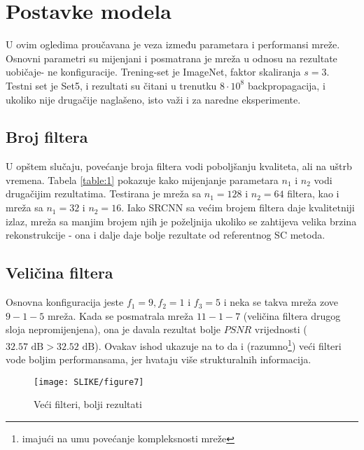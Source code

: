 \documentclass[12pt]{report}
\numberwithin{equation}{section}
\begin{document}
     
  
 
  \section{Postavke modela}
   
   U ovim ogledima proučavana je veza između parametara i performansi mreže. Osnovni parametri su mijenjani i posmatrana je mreža u odnosu na rezultate uobičaje-
ne konfiguracije. Trening-set je ImageNet, faktor skaliranja $s=3$. Testni set je Set5, i rezultati su čitani u trenutku $8 \cdot 10^8$ backpropagacija, i ukoliko nije drugačije naglašeno, isto važi i za naredne eksperimente.


  \subsection{Broj filtera}
  
   U opštem slučaju, povećanje broja filtera vodi poboljšanju kvaliteta, ali na uštrb vremena. Tabela \ref{table:1}
pokazuje kako mijenjanje parametara $n_1$ i $n_2$ vodi drugačijim rezultatima. Testirana je mreža sa $n_1=128$ i $n_2=64$ filtera, kao i mreža sa $n_1=32$ i $n_2=16$. Iako SRCNN sa većim brojem filtera daje kvalitetniji izlaz, mreža sa manjim brojem njih je poželjnija ukoliko se zahtijeva velika brzina rekonstrukcije - ona i dalje daje bolje rezultate od referentnog SC metoda.  
   
  \subsection{Veličina filtera}
   
  Osnovna konfiguracija jeste $f_1=9, f_2=1$ i $f_3=5$ i neka se takva  mreža zove $9-1-5$ mreža. Kada se posmatrala mreža $11-1-7$ (veličina filtera drugog sloja nepromijenjena), ona je davala rezultat bolje $PSNR$ vrijednosti ($32.57 \text{ dB} > 32.52 \text{ dB}$). Ovakav ishod ukazuje na to da i (razumno\footnote{imajući na umu povećanje kompleksnosti mreže}) veći filteri vode boljim performansama, jer hvataju više strukturalnih informacija. 

\begin{wrapfigure}{r}{0.55\textwidth}
\vspace{-20pt}  
  \begin{center}
    \texttt{[image: SLIKE/figure7]}
  \end{center}
  \vspace{-20pt}
  \caption{Veći filteri, bolji rezultati}
  \vspace{-20pt}
  \label{fig:fsize}
\end{wrapfigure}  
  
\end{document}
